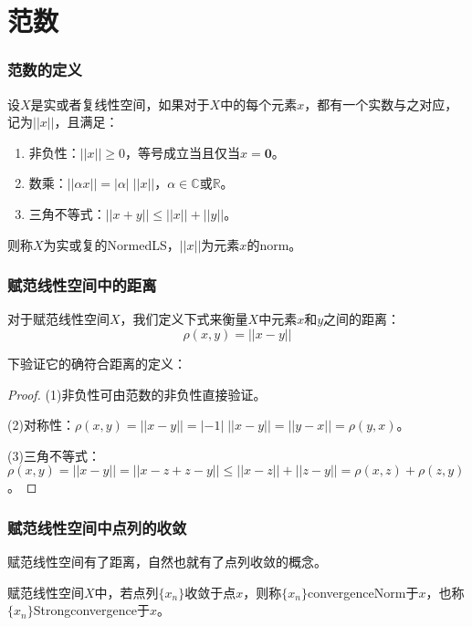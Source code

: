 \section{范数}
\subsubsection{范数的定义}
\begin{definition}
	设$X$是实或者复线性空间，如果对于$X$中的每个元素$x$，都有一个实数与之对应，记为$||x||$，且满足：
	\begin{enumerate}
		\item 非负性：$||x||\geqslant 0$，等号成立当且仅当$x=\mathbf{0}$。
		\item 数乘：$||\alpha x||=|\alpha|\;||x||$，$\alpha\in\mathbb{C}$或$\mathbb{R}$。
		\item 三角不等式：$||x+y||\leqslant||x||+||y||$。
	\end{enumerate}
	则称$X$为实或复的\gls{NormedLS}，$||x||$为元素$x$的\gls{norm}。
\end{definition}
\subsubsection{赋范线性空间中的距离}
\begin{definition}
	对于赋范线性空间$X$，我们定义下式来衡量$X$中元素$x$和$y$之间的距离：
	\begin{equation*}
		\rho(x,y)=||x-y||
	\end{equation*}
\end{definition}
下验证它的确符合距离的定义：
\begin{proof}
	(1)非负性可由范数的非负性直接验证。\par
	(2)对称性：$\rho(x,y)=||x-y||=|-1|\;||x-y||=||y-x||=\rho(y,x)$。\par
	(3)三角不等式：$\rho(x,y)=||x-y||=||x-z+z-y||\leqslant||x-z||+||z-y||=\rho(x,z)+\rho(z,y)$。
\end{proof}
\subsubsection{赋范线性空间中点列的收敛}
赋范线性空间有了距离，自然也就有了点列收敛的概念。
\begin{definition}
	赋范线性空间$X$中，若点列$\{x_n\}$收敛于点$x$，则称$\{x_n\}$\gls{convergenceNorm}于$x$，也称$\{x_n\}$\gls{Strongconvergence}于$x$。
\end{definition}
